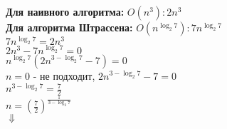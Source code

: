 \documentclass[12pt]{article}
\begin{document}
	\textbf{Для наивного алгоритма:} $O(n^3): 2n^3$ \\
	\textbf{Для алгоритма Штрассена:} $O(n^{\log_{2}{7}}): 7n^{\log_{2}{7}}$ \\
	$7n^{\log_{2}{7}} = 2n^3$ \\
	$2n^3 - 7n^{\log_{2}{7}} = 0$ \\
	$n^{\log_{2}{7}}(2n^{3 - \log_{2}{7}} - 7) = 0$ \\
	$n = 0$ - не подходит, $2n^{3 - \log_{2}{7}} - 7 = 0$ \\
	$n^{3 - \log_{2}{7}} = \frac{7}{2}$ \\
	$n = (\frac{7}{2})^{\frac{1}{3 - \log_{2}{7}}}$ \\
	$\Downarrow$\\
\end{document}
